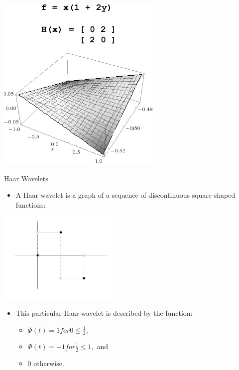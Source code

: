 \documentclass[xcolor=dvipsnames]{beamer}
\begin{document}
\begin{frame}
\begin{center}
\includegraphics[width=.7\textwidth]{imgs/hessian.jpg}
\end{center}
\end{frame}

\begin{frame}[label=math-haar]{Haar Wavelets}
\begin{itemize}
 \item A Haar wavelet is a graph of a sequence of discontinuous square-shaped functions: 
\end{itemize} 
 \begin{center}
 \includegraphics[width=.3\textwidth]{imgs/haar-wavelet.png}
 \end{center}
\begin{itemize}
 \item This particular Haar wavelet is described by the function:
 \begin{itemize} 
 \item $\Phi(t) = 1 for 0 \leq \frac{1}{2},$
 \item $\Phi(t) = -1 for \frac{1}{2} \leq 1,$ and 
 \item $0$ otherwise.
 \end{itemize} 
\end{itemize} 
\end{frame}
\end{document}
